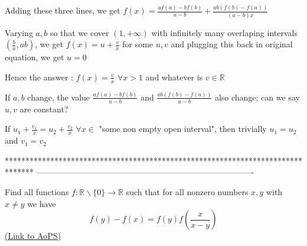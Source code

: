 \begin{solution}
	\begin{tcolorbox}Adding these three lines, we get $f(x)=\frac{af(a)-bf(b)}{a-b}+\frac{ab(f(b)-f(a))}{(a-b)x}$ 

Varying $a,b$ so that we cover $(1,+\infty)$ with infinitely many overlaping intervals $(\frac ba,ab)$, we get ${f(x)=u+\frac vx}$ for some $u,v$ and plugging this back in original equation, we get $u=0$

Hence the answer : $\boxed{f(x)=\frac vx}$ $\forall x>1$ and whatever is $v\in\mathbb R$\end{tcolorbox}

If $a,b$ change, the value $\frac{af(a)-bf(b)}{a-b}$ and $\frac{ab(f(b)-f(a))}{a-b}$ also change; can we say $u,v$ are constant?
\end{solution}



\begin{solution}
	If $u_1+\frac{v_1}x=u_2+\frac{v_2}x$ $\forall x\in$ "some non empty open interval", then trivially $u_1=u_2$ and $v_1=v_2$
\end{solution}
*******************************************************************************
-------------------------------------------------------------------------------

\begin{problem}
	Find all functions $f:\mathbb{R}\backslash\{0\}\to\mathbb{R}$ such that for all nonzero numbers $x,y$ with $x\neq y$  we have
\[f(y)-f(x)=f(y)f\left (\frac{x}{x-y}\right)\]
	\flushright \href{https://artofproblemsolving.com/community/c6h606161}{(Link to AoPS)}
\end{problem}



